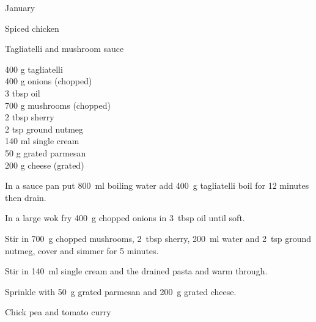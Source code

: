 \begin{menu}{January}
\begin{recipe}{2}{Spiced chicken}
\begin{instructions}
    \end{instructions}
    \end{recipe}%
  
    \begin{recipe}{2}{Tagliatelli and mushroom sauce}%
    
		\begin{ingredients}
		400 g tagliatelli  \\
	400 g onions (chopped) \\
	3 tbsp oil  \\
	700 g mushrooms (chopped) \\
	2 tbsp sherry  \\
	2 tsp ground nutmeg  \\
	140 ml single cream  \\
	50 g grated parmesan  \\
	200 g cheese (grated) \\
	
		\end{ingredients}
	
    \begin{instructions}
    \item 
      In a
      sauce pan
      put
      800~ml  boiling water
      add
      400~g  tagliatelli
      boil for 12 minutes then drain.
    \item 
        In a large wok fry
        400~g chopped onions
        in
        3~tbsp  oil
        until soft.
      \item 
        Stir in
        700~g chopped mushrooms,
        2~tbsp  sherry,
        200~ml  water
        and
        2~tsp  ground nutmeg,
        cover and simmer for 5 minutes.
      \item 
        Stir in
        140~ml  single cream
        and the drained pasta
        and warm through.
      \item 
        Sprinkle with
        50~g  grated parmesan
        and
        200~g grated cheese.
      
    \end{instructions}
    \end{recipe}%
  
    \begin{recipe}{2}{Chick pea and tomato curry}%
    

\end{recipe}
\end{menu}
